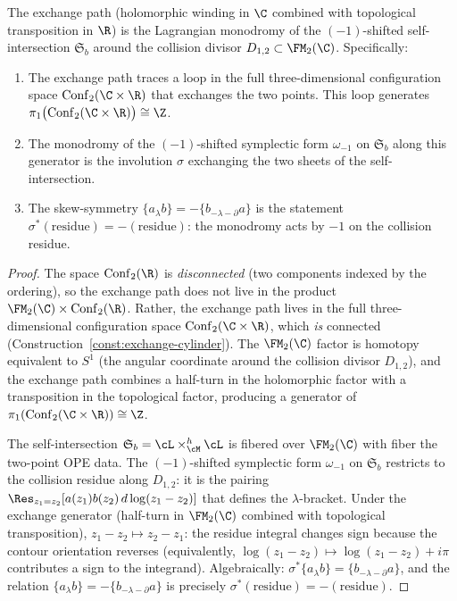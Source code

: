 \begin{proposition}
\label{prop:exchange-lagrangian-monodromy}
The exchange path \textup{(}holomorphic winding in $\C$ combined
with topological transposition in $\R$\textup{)} is the Lagrangian
monodromy of the $(-1)$-shifted self-intersection\/
$\mathfrak{S}_b$ around the collision divisor\/
$D_{1,2} \subset \FM_2(\C)$. Specifically:
\begin{enumerate}[label=\textup{(\roman*)}]
\item The exchange path traces a loop in the full
 three-dimensional configuration space\/
 $\mathrm{Conf}_2(\C \times \R)$ that exchanges the two
 points. This loop generates\/
 $\pi_1\bigl(\mathrm{Conf}_2(\C \times \R)\bigr) \cong \Z$.
\item The monodromy of the $(-1)$-shifted symplectic form\/
 $\omega_{-1}$ on\/ $\mathfrak{S}_b$ along this generator is the
 involution $\sigma$ exchanging the two sheets of the
 self-intersection.
\item The skew-symmetry\/
 $\{a_\lambda b\} = -\{b_{-\lambda-\partial} a\}$ is the statement\/
 $\sigma^*(\mathrm{residue}) = -(\mathrm{residue})$:
 the monodromy acts by $-1$ on the collision residue.
\end{enumerate}
\end{proposition}

\begin{proof}
The space $\mathrm{Conf}_2(\R)$ is \emph{disconnected} (two
components indexed by the ordering), so the exchange path does
not live in the product $\FM_2(\C) \times \mathrm{Conf}_2(\R)$.
Rather, the exchange path lives in the full three-dimensional
configuration space $\mathrm{Conf}_2(\C \times \R)$, which
\emph{is} connected (Construction~\ref{const:exchange-cylinder}).
The $\FM_2(\C)$ factor is homotopy equivalent to $S^1$ (the
angular coordinate around the collision divisor $D_{1,2}$), and
the exchange path combines a half-turn in the holomorphic factor
with a transposition in the topological factor, producing a
generator of $\pi_1(\mathrm{Conf}_2(\C \times \R)) \cong \Z$.

The self-intersection $\mathfrak{S}_b = \cL \times_{\cM}^h \cL$
is fibered over $\FM_2(\C)$ with fiber the two-point OPE data.
The $(-1)$-shifted symplectic form $\omega_{-1}$ on $\mathfrak{S}_b$
restricts to the collision residue along $D_{1,2}$: it is the
pairing $\Res_{z_1 = z_2}[a(z_1) b(z_2) \, d\log(z_1 - z_2)]$
that defines the $\lambda$-bracket. Under the exchange generator
(half-turn in $\FM_2(\C)$ combined with topological transposition),
$z_1 - z_2 \mapsto z_2 - z_1$: the residue integral changes sign
because the contour orientation reverses (equivalently,
$\log(z_1-z_2) \mapsto \log(z_1-z_2) + i\pi$ contributes a
sign to the integrand). Algebraically:
$\sigma^*\{a_\lambda b\} = \{b_{-\lambda - \partial} a\}$, and
the relation $\{a_\lambda b\} = -\{b_{-\lambda - \partial} a\}$
is precisely $\sigma^*(\mathrm{residue}) = -(\mathrm{residue})$.
\end{proof}

